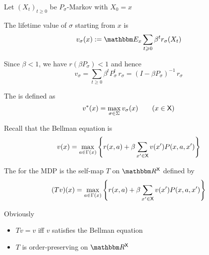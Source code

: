 \begin{frame}

    Let $(X_t)_{t \geq 0}$ be $P_\sigma$-Markov with $X_0 = x$
    
    \vspace{0.5em}
    \vspace{0.5em}
    The lifetime value of $\sigma$ starting from $x$ is
    \begin{equation*}
        v_\sigma (x) 
        := \EE_x \sum_{t \geq 0} \beta^t
            r_\sigma(X_t) 
    \end{equation*}


    \vspace{0.5em}
    Since $\beta < 1$, we have $r(\beta P_\sigma) <1$ and hence
    \begin{equation*}
        v_\sigma 
        = \sum_{t \geq 0} \beta^t P_\sigma^t \, r_\sigma 
        = (I - \beta P_\sigma)^{-1} \, r_\sigma 
    \end{equation*}

    \vspace{0.5em}
    The  is defined as 
    \begin{equation*}
        v^*(x) = \max_{\sigma \in \Sigma} v_\sigma(x)
        \qquad (x \in \mathsf X)
    \end{equation*}

\end{frame}


\begin{frame}
    
    Recall that the Bellman equation is 
    \begin{equation*}
            v(x)
            = \max_{a \in \Gamma(x)}
            \left\{
                r(x, a)
                + \beta
                \sum_{x' \in \mathsf X} v(x') P(x, a, x')
            \right\}
    \end{equation*}

    \vspace{0.5em}
    The  for the MDP
    is the self-map $T$ on $\RR^\Xsf$ defined by
    \begin{equation*}
        (Tv)(x)
            = \max_{a \in \Gamma(x)}
            \left\{
                r(x, a)
                + \beta
                \sum_{x' \in \mathsf X} v(x') P(x, a, x')
            \right\}
    \end{equation*}

    Obviously 
    \begin{itemize}
        \item $Tv=v$ iff $v$ satisfies the Bellman equation
    \vspace{0.5em}
        \item $T$ is order-preserving on $\RR^\Xsf$
    \end{itemize}

\end{frame}



